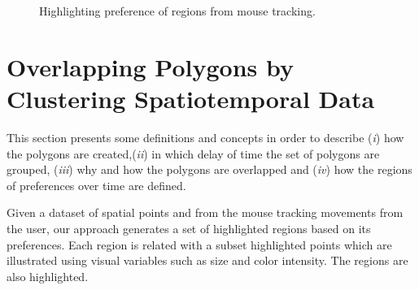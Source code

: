 \documentclass[runningheads,a4paper]{llncs}
\begin{document}
\begin{figure}
  \\ %
  \\ %
  \caption{Highlighting preference of regions from mouse tracking. }
\end{figure} %


\section{Overlapping Polygons by Clustering Spatiotemporal Data}
\label{sec:overpolygons}

This section presents some definitions and concepts in order to describe (\textit{i}) how the polygons are created,(\textit{ii}) in which delay of time the set of polygons are grouped, (\textit{iii})  why and how the polygons are overlapped and  (\textit{iv}) how the regions of preferences over time are defined.

Given a dataset of spatial points and from the mouse tracking movements from the user, our approach generates a set of highlighted regions based on its preferences. Each region is related with a subset highlighted points which are illustrated using visual variables such as size and color intensity. The regions are also highlighted.
\end{document}
